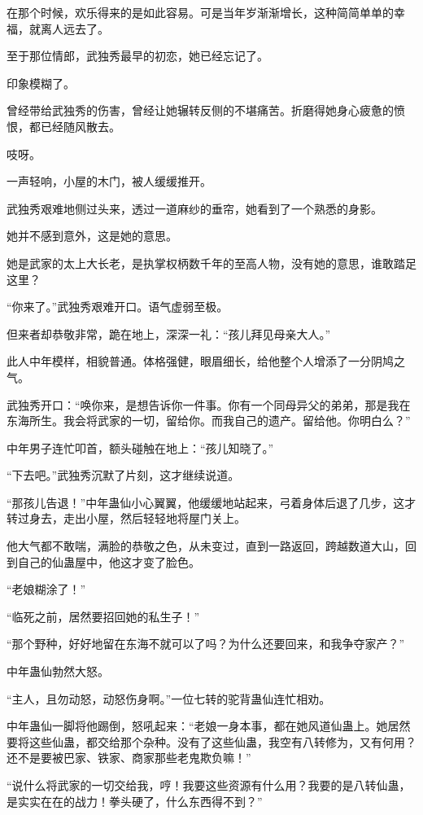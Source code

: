 \begin{this_body}
在那个时候，欢乐得来的是如此容易。可是当年岁渐渐增长，这种简简单单的幸福，就离人远去了。

至于那位情郎，武独秀最早的初恋，她已经忘记了。

印象模糊了。

曾经带给武独秀的伤害，曾经让她辗转反侧的不堪痛苦。折磨得她身心疲惫的愤恨，都已经随风散去。

吱呀。

一声轻响，小屋的木门，被人缓缓推开。

武独秀艰难地侧过头来，透过一道麻纱的垂帘，她看到了一个熟悉的身影。

她并不感到意外，这是她的意思。

她是武家的太上大长老，是执掌权柄数千年的至高人物，没有她的意思，谁敢踏足这里？

“你来了。”武独秀艰难开口。语气虚弱至极。

但来者却恭敬非常，跪在地上，深深一礼：“孩儿拜见母亲大人。”

此人中年模样，相貌普通。体格强健，眼眉细长，给他整个人增添了一分阴鸠之气。

武独秀开口：“唤你来，是想告诉你一件事。你有一个同母异父的弟弟，那是我在东海所生。我会将武家的一切，留给你。而我自己的遗产。留给他。你明白么？”

中年男子连忙叩首，额头碰触在地上：“孩儿知晓了。”

“下去吧。”武独秀沉默了片刻，这才继续说道。

“那孩儿告退！”中年蛊仙小心翼翼，他缓缓地站起来，弓着身体后退了几步，这才转过身去，走出小屋，然后轻轻地将屋门关上。

他大气都不敢喘，满脸的恭敬之色，从未变过，直到一路返回，跨越数道大山，回到自己的仙蛊屋中，他这才变了脸色。

“老娘糊涂了！”

“临死之前，居然要招回她的私生子！”

“那个野种，好好地留在东海不就可以了吗？为什么还要回来，和我争夺家产？”

中年蛊仙勃然大怒。

“主人，且勿动怒，动怒伤身啊。”一位七转的驼背蛊仙连忙相劝。

中年蛊仙一脚将他踢倒，怒吼起来：“老娘一身本事，都在她风道仙蛊上。她居然要将这些仙蛊，都交给那个杂种。没有了这些仙蛊，我空有八转修为，又有何用？还不是要被巴家、铁家、商家那些老鬼欺负嘛！”

“说什么将武家的一切交给我，哼！我要这些资源有什么用？我要的是八转仙蛊，是实实在在的战力！拳头硬了，什么东西得不到？”


\end{this_body}
